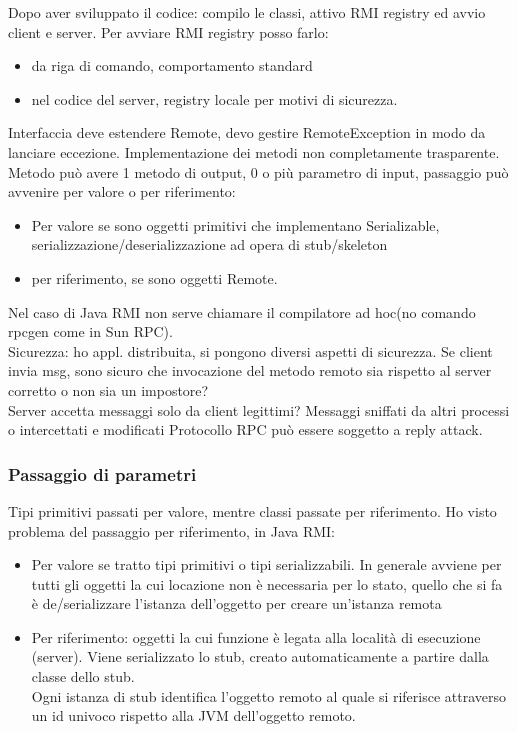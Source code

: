 \documentclass[16px]{article}
\begin{document}
Dopo aver sviluppato il codice: compilo le classi, attivo RMI registry ed avvio client e server. Per avviare RMI registry posso farlo:
\begin{itemize}
\item da riga di comando, comportamento standard
\item nel codice del server, registry locale per motivi di sicurezza.
\end{itemize}
Interfaccia deve estendere Remote, devo gestire RemoteException in modo da lanciare eccezione. Implementazione dei metodi non completamente trasparente. Metodo può avere 1 metodo di output, 0 o più parametro di input, passaggio può avvenire per valore o per riferimento:
\begin{itemize}
\item Per valore se sono oggetti primitivi che implementano Serializable, serializzazione/deserializzazione ad opera di stub/skeleton
\item per riferimento, se sono oggetti Remote.
\end{itemize}
Nel caso di Java RMI non serve chiamare il compilatore ad hoc(no comando rpcgen come in Sun RPC).\\ Sicurezza: ho appl. distribuita, si pongono diversi aspetti di sicurezza. Se client invia msg, sono sicuro che invocazione del metodo remoto sia rispetto al server corretto o non sia un impostore?\\ Server accetta messaggi solo da client legittimi? Messaggi sniffati da altri processi o intercettati e modificati Protocollo RPC può essere soggetto a reply attack.
\subsubsection{Passaggio di parametri}
Tipi primitivi passati per valore, mentre classi passate per riferimento. Ho visto problema del passaggio per riferimento, in Java RMI:
\begin{itemize}
\item Per valore se tratto tipi primitivi o tipi serializzabili. In generale avviene per tutti gli oggetti la cui locazione non è necessaria per lo stato, quello che si fa è de/serializzare l'istanza dell'oggetto per creare un'istanza remota
\item Per riferimento: oggetti la cui funzione è legata alla località di esecuzione (server). Viene serializzato lo stub, creato automaticamente a partire dalla classe dello stub.\\ Ogni istanza di stub identifica l'oggetto remoto al quale si riferisce attraverso un id univoco rispetto alla JVM dell'oggetto remoto. 
\end{itemize}
\end{document}
